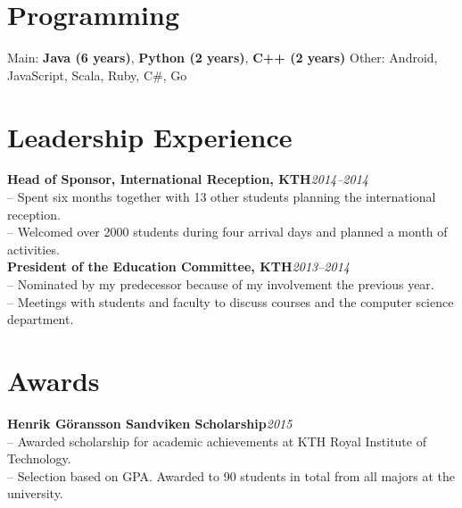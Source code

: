 \documentclass[10pt]{article}
\begin{document}
\section*{Programming}
\indent Main: \textbf{Java (6 years)}, \textbf{Python (2 years)}, \textbf{C++ (2 years)}\hspace{2em} Other: Android, JavaScript, Scala, Ruby, C\#, Go\\

\section*{Leadership Experience}
\noindent\textbf{Head of Sponsor, International Reception, KTH}\hfill\textit{2014--2014} \\
\indent-- Spent six months together with 13 other students planning the international reception.\\
\indent-- Welcomed over 2000 students during four arrival days and planned a month of activities. \\

\noindent\textbf{President of the Education Committee, KTH}\hfill\textit{2013--2014} \\
\indent-- Nominated by my predecessor because of my involvement the previous year.\\
\indent-- Meetings with students and faculty to discuss courses and the computer science department.\\

\section*{Awards}
\textbf{Henrik Göransson Sandviken Scholarship}\hfill\textit{2015}\\
\indent-- Awarded scholarship for academic achievements at KTH Royal Institute of Technology.\\
\indent-- Selection based on GPA. Awarded to 90 students in total from all majors at the university.\\
\end{document}
